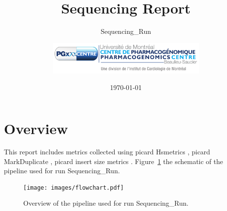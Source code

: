 \documentclass[10pt,twoside,english]{scrartcl}
\newcommand{\RunName}{Sequencing\_Run}
\begin{document}
\title{Sequencing Report}
\subtitle{\RunName}
\author{\includegraphics[width=0.6\textwidth]{images/pgx_logo.pdf}}
\date{\today}
\maketitle

\tableofcontents{}
\listoffigures{}
\cleardoublepage
\section{Overview}
This report includes metrics collected using picard Hsmetrics , picard
MarkDuplicate , picard insert size metrics . 
 Figure~\ref{pipeline_overview} 
the schematic of the pipeline used for run \RunName. 

\begin{figure}[H]
\centering 
\texttt{[image: images/flowchart.pdf]} 
\caption[Pipeline overview]{Overview of the pipeline used for run 
\RunName.\label{pipeline_overview}} 
\end{figure} 
\end{document}
